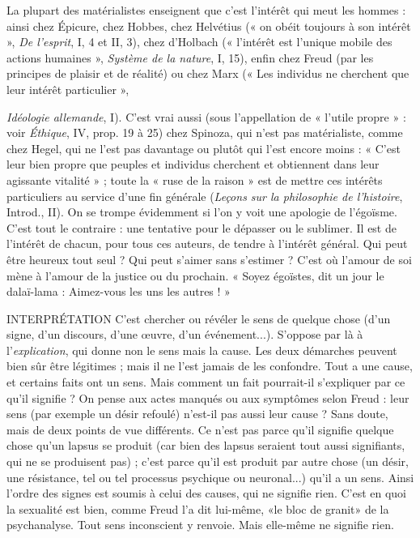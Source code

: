 La plupart des matérialistes enseignent que c’est l'intérêt qui meut les
hommes : ainsi chez Épicure, chez Hobbes, chez Helvétius (« on obéit toujours
à son intérêt », {\it De l'esprit}, I, 4 et II, 3), chez d’Holbach (« l'intérêt est l’unique
mobile des actions humaines », {\it Système de la nature}, I, 15), enfin chez Freud
(par les principes de plaisir et de réalité) ou chez Marx (« Les individus ne cherchent
que leur intérêt particulier », {{\it Idéologie allemande}, I). C’est vrai aussi (sous
l'appellation de « l’utile propre » : voir {\it Éthique}, IV, prop. 19 à 25) chez Spinoza,
qui n'est pas matérialiste, comme chez Hegel, qui ne l’est pas davantage
ou plutôt qui l’est encore moins : « C’est leur bien propre que peuples et individus
cherchent et obtiennent dans leur agissante vitalité » ; toute la « ruse de la
raison » est de mettre ces intérêts particuliers au service d’une fin générale
({\it Leçons sur la philosophie de l'histoire}, Introd., II). On se trompe évidemment si
l’on y voit une apologie de l’égoïsme. C’est tout le contraire : une tentative
pour le dépasser ou le sublimer. Il est de l'intérêt de chacun, pour tous ces
auteurs, de tendre à l'intérêt général. Qui peut être heureux tout seul ? Qui
peut s’aimer sans s’estimer ? C’est où l’amour de soi mène à l’amour de la justice
ou du prochain. « Soyez égoïstes, dit un jour le dalaï-lama : Aimez-vous les
uns les autres ! »

INTERPRÉTATION C'est chercher ou révéler le sens de quelque chose
(d’un signe, d’un discours, d’une œuvre, d’un événement...).
S'oppose par là à l'{\it explication}, qui donne non le sens mais la cause.
Les deux démarches peuvent bien sûr être légitimes ; mais il ne l’est jamais de
les confondre. Tout a une cause, et certains faits ont un sens. Mais comment
un fait pourrait-il s’expliquer par ce qu’il signifie ? On pense aux actes manqués
ou aux symptômes selon Freud : leur sens (par exemple un désir refoulé) n’est-il
pas aussi leur cause ? Sans doute, mais de deux points de vue différents. Ce
n’est pas parce qu’il signifie quelque chose qu’un lapsus se produit (car bien des
lapsus seraient tout aussi signifiants, qui ne se produisent pas) ; c’est parce qu’il
est produit par autre chose (un désir, une résistance, tel ou tel processus psychique
ou neuronal...) qu’il a un sens. Ainsi l’ordre des signes est soumis à
celui des causes, qui ne signifie rien. C’est en quoi la sexualité est bien, comme
Freud l’a dit lui-même, «le bloc de granit» de la psychanalyse. Tout sens
inconscient y renvoie. Mais elle-même ne signifie rien.

}

